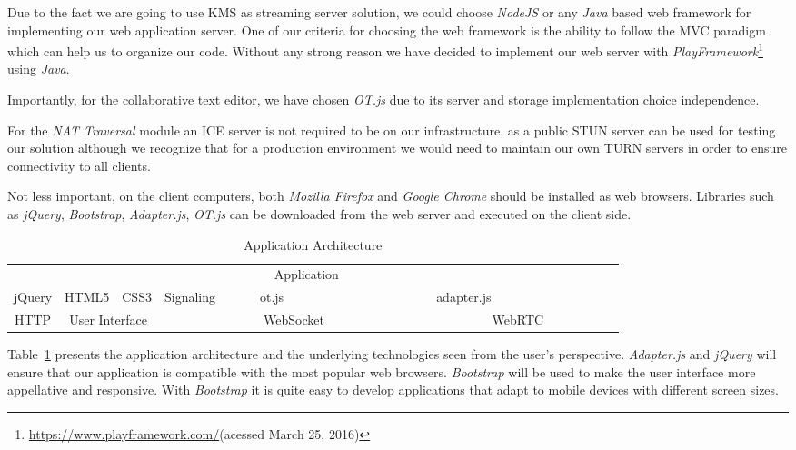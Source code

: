 Due to the fact we are going to use \ac{KMS} as streaming server solution, we could choose \emph{NodeJS} or any \emph{Java} based web framework for implementing our web application server. One of our criteria for choosing the web framework is the ability to follow the \ac{MVC} paradigm which can help us to organize our code. Without any strong reason we have decided to implement our web server with \emph{PlayFramework}\footnote{\url{https://www.playframework.com/}(acessed March 25, 2016)} using \emph{Java}.

Importantly, for the collaborative text editor, we have chosen \emph{OT.js} due to its server and storage implementation choice independence.

For the \emph{NAT Traversal} module an \ac{ICE} server is not required to be on our infrastructure, as a public \ac{STUN} server can be used for testing our solution although we recognize that for a production environment we would need to maintain our own \ac{TURN} servers in order to ensure connectivity to all clients.

Not less important, on the client computers, both \emph{Mozilla Firefox} and \emph{Google Chrome} should be installed as web browsers. Libraries such as \emph{jQuery}, \emph{Bootstrap}, \emph{Adapter.js}, \emph{OT.js} can be downloaded from the web server and executed on the client side.

\begin{table}[H]
\centering
	\caption{Application Architecture}
	\label{table:apparch}
    \begin{tabular}{cccccccc@{}m{0pt}@{}}
	\hline 
\multicolumn{8}{|c|}{\cellcolor{Gray}Application}  &\\[12pt]\cline{1-5}\cline{7-7}
\multicolumn{1}{|c|}{jQuery} & \multicolumn{1}{c|}{HTML5} & \multicolumn{1}{c|}{CSS3} & \multicolumn{1}{c|}{Signaling} & \multicolumn{1}{c|}{~~~~~ot.js~~~~~} & \multicolumn{1}{c|}{\cellcolor{Gray}~~~~~~~~~~~~~~~} & \multicolumn{1}{c|}{adapter.js} &   \multicolumn{1}{c|}{\cellcolor{Gray}~~~~~~~~~~~~~~~} &\\[12pt]\hline
\multicolumn{1}{|c|}{HTTP} & \multicolumn{2}{c|}{User Interface}  & \multicolumn{3}{c|}{WebSocket}    & \multicolumn{2}{c|}{WebRTC}      &\\[12pt]\hline
\end{tabular}
\end{table}

Table~\ref{table:apparch} presents the application architecture and the underlying technologies seen from the user's perspective. \emph{Adapter.js} and \emph{jQuery} will ensure that our application is compatible with the most popular web browsers.
\emph{Bootstrap} will be used to make the user interface more appellative and responsive. With \emph{Bootstrap} it is quite easy to develop applications that adapt to mobile devices with different screen sizes.

